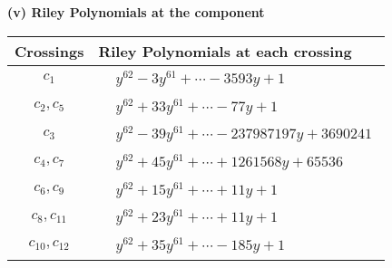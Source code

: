 \documentclass[1p]{elsarticle_modified}
\theoremstyle{definition}
\begin{document}
\flushleft \textbf{(v) Riley Polynomials at the component}\newline \\
\begin{tabular}{m{50pt}|m{274pt}}
Crossings & \hspace{64pt}Riley Polynomials at each crossing \\
\hline $$\begin{aligned}c_{1}\end{aligned}$$&$\begin{aligned}
&y^{62}-3 y^{61}+\cdots-3593 y+1
\end{aligned}$\\
\hline $$\begin{aligned}c_{2},c_{5}\end{aligned}$$&$\begin{aligned}
&y^{62}+33 y^{61}+\cdots-77 y+1
\end{aligned}$\\
\hline $$\begin{aligned}c_{3}\end{aligned}$$&$\begin{aligned}
&y^{62}-39 y^{61}+\cdots-237987197 y+3690241
\end{aligned}$\\
\hline $$\begin{aligned}c_{4},c_{7}\end{aligned}$$&$\begin{aligned}
&y^{62}+45 y^{61}+\cdots+1261568 y+65536
\end{aligned}$\\
\hline $$\begin{aligned}c_{6},c_{9}\end{aligned}$$&$\begin{aligned}
&y^{62}+15 y^{61}+\cdots+11 y+1
\end{aligned}$\\
\hline $$\begin{aligned}c_{8},c_{11}\end{aligned}$$&$\begin{aligned}
&y^{62}+23 y^{61}+\cdots+11 y+1
\end{aligned}$\\
\hline $$\begin{aligned}c_{10},c_{12}\end{aligned}$$&$\begin{aligned}
&y^{62}+35 y^{61}+\cdots-185 y+1
\end{aligned}$\\
\hline
\end{tabular}\\~\\
\end{document}
